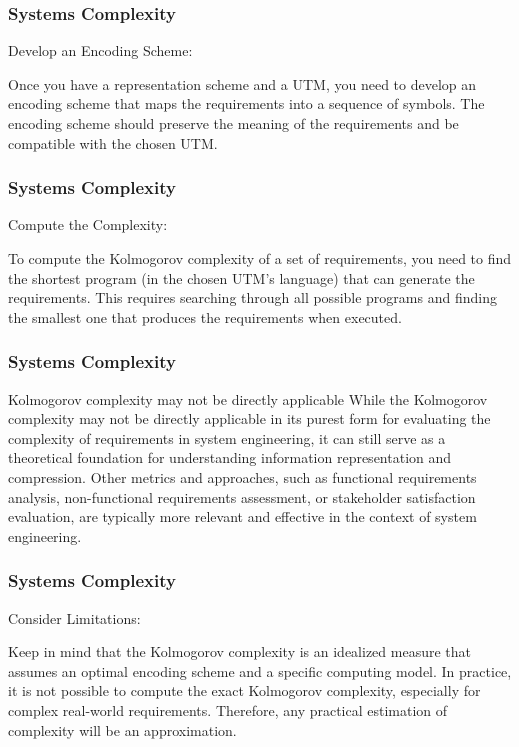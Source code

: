\newpage
\begin{frame}
\frametitle{Systems Complexity }
\begin{block}{Develop an Encoding Scheme:}

 Once you have a representation scheme and a UTM, you need to develop an encoding scheme that maps the requirements into a sequence of symbols. The encoding scheme should preserve the meaning of the requirements and be compatible with the chosen UTM.

\end{block}
\end{frame}



\newpage
\begin{frame}
\frametitle{Systems Complexity }
\begin{block}{Compute the Complexity: }


To compute the Kolmogorov complexity of a set of requirements, you need to find the shortest program (in the chosen UTM's language) that can generate the requirements. This requires searching through all possible programs and finding the smallest one that produces the requirements when executed.



\end{block}
\end{frame}



\newpage
\begin{frame}
\frametitle{Systems Complexity }
\begin{block}{Kolmogorov complexity may not be directly applicable  }
While the Kolmogorov complexity may not be directly applicable in its purest form for evaluating the complexity of requirements in system engineering, it can still serve as a theoretical foundation for understanding information representation and compression. Other metrics and approaches, such as functional requirements analysis, non-functional requirements assessment, or stakeholder satisfaction evaluation, are typically more relevant and effective in the context of system engineering.


\end{block}
\end{frame}



\newpage
\begin{frame}
\frametitle{Systems Complexity }
\begin{block}{Consider Limitations: }



Keep in mind that the Kolmogorov complexity is an idealized measure that assumes an optimal encoding scheme and a specific computing model. In practice, it is not possible to compute the exact Kolmogorov complexity, especially for complex real-world requirements. Therefore, any practical estimation of complexity will be an approximation.

\end{block}
\end{frame}





